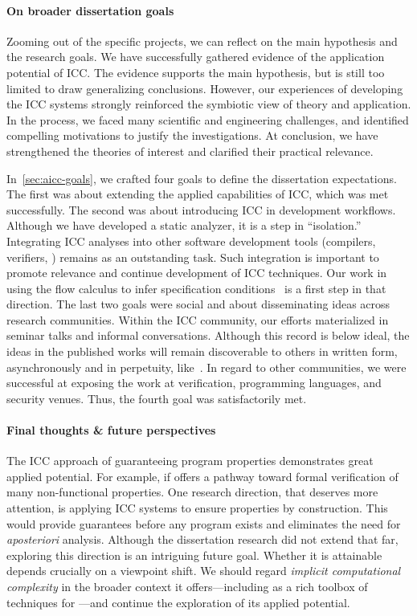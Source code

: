 \paragraph*{On broader dissertation goals} Zooming out of the specific
projects, we can reflect on the main hypothesis and the research goals. We have
successfully gathered evidence of the application potential of ICC. The evidence
supports the main hypothesis, but is still too limited to draw generalizing
conclusions. However, our experiences of developing the ICC systems strongly
reinforced the symbiotic view of theory and application. In the process, we
faced many scientific and engineering challenges, and identified compelling
motivations to justify the investigations. At conclusion, we have strengthened
the theories of interest and clarified their practical relevance.

In~\autoref{sec:aicc-goals}, we crafted four goals to define the dissertation
expectations. The first was about extending the applied capabilities of ICC,
which was met successfully. The second was about introducing ICC in development
workflows. Although we have developed a static analyzer, it is a step in
\enquote{isolation.} Integrating ICC analyses into other software development
tools (compilers, verifiers, \etc) remains as an outstanding task. Such
integration is important to promote relevance and continue development of ICC
techniques. Our work in using the flow calculus to infer
specification conditions~\cite{rusch2025} is a first step
in that direction. The last two goals were social and about disseminating ideas
across research communities. Within the ICC community, our efforts materialized
in seminar talks and informal conversations. Although this record is below
ideal, the ideas in the published works will remain discoverable to others in
written form, asynchronously and in perpetuity, like~\cite{moyen2017}. In regard
to other communities, we were successful at exposing the work at verification,
programming languages, and security venues. Thus, the fourth goal was
satisfactorily met.

\paragraph*{Final thoughts \& future perspectives} The ICC approach of
guaranteeing program properties demonstrates great applied potential. For
example, if offers a pathway toward formal verification of many non-functional
properties. One research direction, that deserves
more attention, is applying ICC systems to ensure properties by construction.
This would provide guarantees before any program exists and eliminates the need
for \emph{aposteriori} analysis. Although the dissertation research did not
extend that far, exploring this direction is an intriguing future goal. Whether
it is attainable depends crucially on a viewpoint shift. We should regard
\emph{implicit computational complexity} in the broader context it
offers---including as a rich toolbox of techniques for ---and continue the exploration of its applied potential.
